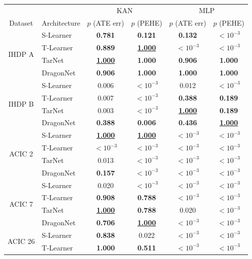 \begin{table}[ht]
\centering
\begin{tabular}{c l cc cc}
& & \multicolumn{2}{c}{KAN} & \multicolumn{2}{c}{MLP} \\
Dataset & Architecture & $p$ (ATE err) & $p$ (PEHE) & $p$ (ATE err) & $p$ (PEHE) \\
\hline
\multirow{4}{*}{IHDP A}
& S-Learner  & \textbf{0.781} &\textbf{0.121} & \textbf{0.132} & $<10^{-3}$ \\
& T-Learner  & \textbf{0.889} & \underline{\textbf{1.000}} & $<10^{-3}$ & $<10^{-3}$ \\
& TarNet     & \underline{\textbf{1.000}} & \textbf{1.000} & \textbf{0.906} & \textbf{1.000} \\
& DragonNet  & \textbf{0.906} & \textbf{1.000} & \textbf{1.000} & \textbf{1.000} \\
\hline
\multirow{4}{*}{IHDP B}
& S-Learner  & 0.006 & $<10^{-3}$ & 0.012 & $<10^{-3}$ \\
& T-Learner  & 0.007 & $<10^{-3}$ & \textbf{0.388} &  \textbf{0.189} \\
& TarNet     & 0.003 & $<10^{-3}$ & \underline{\textbf{1.000}} & \textbf{0.189} \\
& DragonNet  & \textbf{0.388} & \textbf{0.006} & \textbf{0.436} & \underline{\textbf{1.000}} \\
\hline
\multirow{4}{*}{ACIC 2}
& S-Learner  & \underline{\textbf{1.000}} & \underline{\textbf{1.000}} & $<10^{-3}$ & $<10^{-3}$ \\
& T-Learner  & $<10^{-3}$ & $<10^{-3}$ & $<10^{-3}$ & $<10^{-3}$ \\
& TarNet     & 0.013 & $<10^{-3}$ & $<10^{-3}$ & $<10^{-3}$ \\
& DragonNet  & \textbf{0.157} & $<10^{-3}$ & $<10^{-3}$ & $<10^{-3}$ \\
\hline
\multirow{4}{*}{ACIC 7}
& S-Learner  & 0.020 & $<10^{-3}$ & $<10^{-3}$ & $<10^{-3}$ \\
& T-Learner  & \textbf{0.908} & \textbf{0.788} & $<10^{-3}$ & $<10^{-3}$ \\
& TarNet     & \underline{\textbf{1.000}} & \textbf{0.788} & 0.020 & $<10^{-3}$ \\
& DragonNet  & \textbf{0.706} & \underline{\textbf{1.000}} & $<10^{-3}$ & $<10^{-3}$ \\
\hline
\multirow{4}{*}{ACIC 26}
& S-Learner  & \textbf{0.838} & 0.022 & $<10^{-3}$ & $<10^{-3}$ \\
& T-Learner  & \textbf{1.000} & \textbf{0.511} & $<10^{-3}$ & $<10^{-3}$ \\

\end{tabular}
\end{table}
